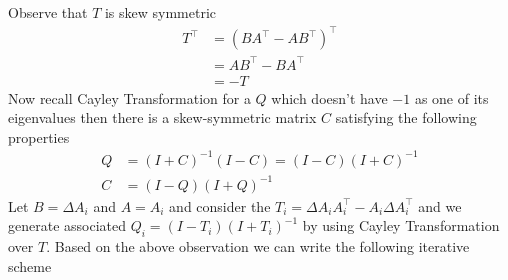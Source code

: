 Observe that $T$ is skew symmetric
\begin{equation}
\begin{aligned}
    T^\top &= (BA^\top- AB^\top)^\top\\
    &= AB^\top - BA^\top \\
    &= -T
\end{aligned}
\end{equation}
Now recall Cayley Transformation for a $Q$ which doesn't have $-1$ as one of its eigenvalues then there is a skew-symmetric matrix $C$ satisfying the following properties
\begin{equation} \label{cayley-transformation} 
\begin{aligned}
    Q &= (I+C)^{-1}(I-C) = (I-C)(I+C)^{-1} \\
    C &= (I-Q)(I+Q)^{-1}
\end{aligned}
\end{equation}
Let $B = \Delta A_i$ and $A = A_i$ and consider the $T_i = \Delta A_iA_i^\top- A_i\Delta A_i^\top$ and we generate associated $Q_i = (I-T_i)(I+T_i)^{-1}$ by using Cayley Transformation over $T$.
\newline Based on the above observation we can write the following iterative scheme

